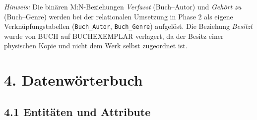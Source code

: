 \documentclass[11pt,a4paper]{article}
\begin{document}
\textit{Hinweis:} Die binären M:N-Beziehungen \emph{Verfasst} (Buch--Autor) und \emph{Gehört zu} (Buch--Genre) werden bei der relationalen Umsetzung in Phase 2 als eigene Verknüpfungstabellen (\texttt{Buch\_Autor}, \texttt{Buch\_Genre}) aufgelöst. Die Beziehung \emph{Besitzt} wurde von BUCH auf BUCHEXEMPLAR verlagert, da der Besitz einer physischen Kopie und nicht dem Werk selbst zugeordnet ist.

\section*{4. Datenwörterbuch}

\subsection*{4.1 Entitäten und Attribute}
\end{document}
